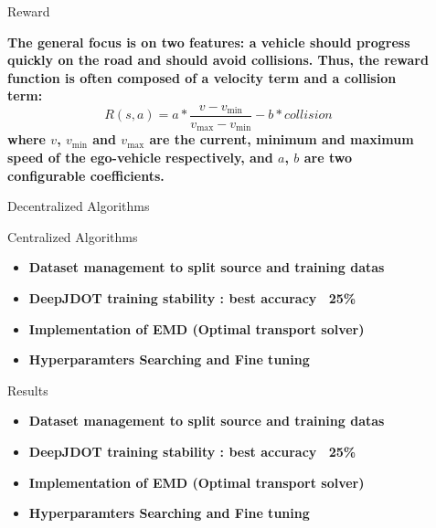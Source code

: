 \documentclass[final]{beamer}
\newlength{\sepmargin}
\newlength{\sepwid}
\newlength{\onecolwid}
\begin{document}
\begin{frame}[t]
\begin{columns}[t]
\begin{column}{\sepwid}\end{column}
\begin{column}{\onecolwid} %
\vspace{1em}

 \begin{block}{Reward}

\textbf{The general focus is on two features: a vehicle should progress quickly on the road and should avoid collisions. Thus, the reward function is often composed of a velocity term and a collision term:\\ 
\begin{equation}
    R(s,a) = a * \frac{v - {v}_{\min}}{{v}_{\max}-{v}_{\min}} - b * {collision}
\end{equation}
where  $v$, ${v}_{\min}$ and ${v}_{\max}$  are the current, minimum and maximum speed of the ego-vehicle respectively, and  $a$, $b$  are two configurable coefficients.}

 \end{block}
               
\begin{block}{Decentralized Algorithms}
 
    \textbf{}

 \end{block} 
 
\begin{block}{Centralized Algorithms}
    \begin{itemize}
      \item \textbf{Dataset management to split source and training datas}
      \item \textbf{DeepJDOT training stability : best accuracy ~25\% }
      \item \textbf{Implementation of EMD (Optimal transport solver)}
      \item \textbf{Hyperparamters Searching and Fine tuning}
    \end{itemize}
\end{block} 

\begin{block}{Results}
    \begin{itemize}
      \item \textbf{Dataset management to split source and training datas}
      \item \textbf{DeepJDOT training stability : best accuracy ~25\% }
      \item \textbf{Implementation of EMD (Optimal transport solver)}
      \item \textbf{Hyperparamters Searching and Fine tuning}
    \end{itemize}
\end{block} 
 
\end{column}%
\begin{column}{\sepmargin} \end{column}
\end{columns} 
\end{frame} 
	
\end{document}
